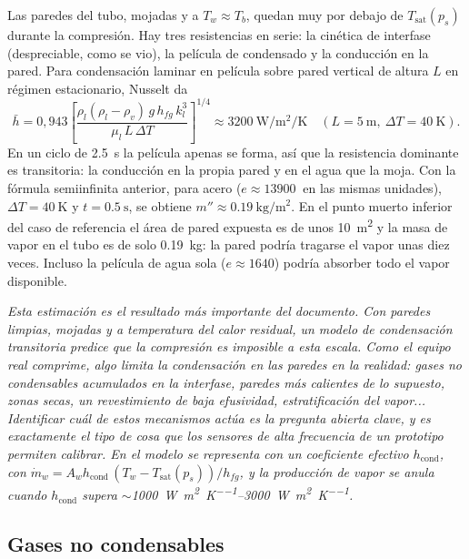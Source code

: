 \documentclass[11pt,a4paper]{article}
\newcommand{\Tsat}{T_{\mathrm{sat}}}
\newcommand{\hfg}{h_{fg}}
\newcommand{\mdot}{\dot m}
\newenvironment{nota}{\par\smallskip\noindent\begin{minipage}{\linewidth}\small\itshape}{\end{minipage}\par\smallskip}
\begin{document}
Las paredes del tubo, mojadas y a $T_w\approx T_b$, quedan muy por debajo de $\Tsat(p_s)$ durante la compresión. Hay tres resistencias en serie: la cinética de interfase (despreciable, como se vio), la película de condensado y la conducción en la pared. Para condensación laminar en película sobre pared vertical de altura $L$ en régimen estacionario, Nusselt da \cite{collier}
\begin{equation}
\bar h = 0{,}943\left[\frac{\rho_l(\rho_l-\rho_v)\,g\,\hfg\,k_l^3}{\mu_l\,L\,\Delta T}\right]^{1/4}\approx\SI{3200}{\watt\per\square\metre\per\kelvin}\quad(L=\SI{5}{\metre},\ \Delta T=\SI{40}{\kelvin}).
\end{equation}
En un ciclo de \SI{2.5}{\second} la película apenas se forma, así que la resistencia dominante es transitoria: la conducción en la propia pared y en el agua que la moja. Con la fórmula semiinfinita anterior, para acero ($e\approx\SI{13900}{}$ en las mismas unidades), $\Delta T=\SI{40}{\kelvin}$ y $t=\SI{0.5}{\second}$, se obtiene $m''\approx\SI{0.19}{\kilo\gram\per\square\metre}$. En el punto muerto inferior del caso de referencia el área de pared expuesta es de unos \SI{10}{\square\metre} y la masa de vapor en el tubo es de solo \SI{0.19}{\kilo\gram}: la pared podría tragarse el vapor unas diez veces. Incluso la película de agua sola ($e\approx1640$) podría absorber todo el vapor disponible.

\begin{nota}
Esta estimación es el resultado más importante del documento. Con paredes limpias, mojadas y a temperatura del calor residual, un modelo de condensación transitoria predice que la compresión es imposible a esta escala. Como el equipo real comprime, algo limita la condensación en las paredes en la realidad: gases no condensables acumulados en la interfase, paredes más calientes de lo supuesto, zonas secas, un revestimiento de baja efusividad, estratificación del vapor... Identificar cuál de estos mecanismos actúa es la pregunta abierta clave, y es exactamente el tipo de cosa que los sensores de alta frecuencia de un prototipo permiten calibrar. En el modelo se representa con un coeficiente efectivo $h_{\mathrm{cond}}$, con $\mdot_w = A_w h_{\mathrm{cond}}\,(T_w - \Tsat(p_s))/\hfg$, y la producción de vapor se anula cuando $h_{\mathrm{cond}}$ supera $\sim$\SIrange{1000}{3000}{\watt\per\square\metre\per\kelvin}.
\end{nota}

\subsection{Gases no condensables}\label{sec:nocondensables}
\end{document}
